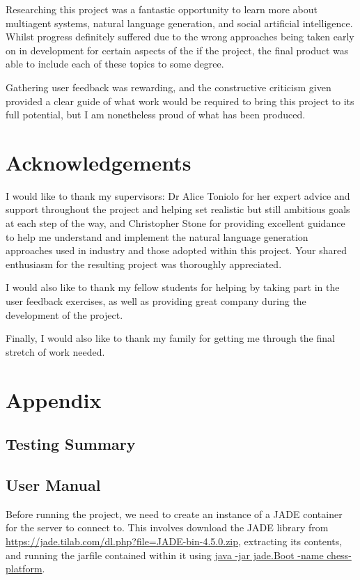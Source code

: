 \documentclass{article}
\begin{document}
Researching this project was a fantastic opportunity to learn more about multiagent systems, natural language generation, and social artificial intelligence. Whilst progress definitely suffered due to the wrong approaches being taken early on in development for certain aspects of the if the project, the final product was able to include each of these topics to some degree. 

Gathering user feedback was rewarding, and the constructive criticism given provided a clear guide of what work would be required to bring this project to its full potential, but I am nonetheless proud of what has been produced.

\section{Acknowledgements}

I would like to thank my supervisors: Dr Alice Toniolo for her expert advice and support throughout the project and helping set realistic but still ambitious goals at each step of the way, and Christopher Stone for providing excellent guidance to help me understand and implement the natural language generation approaches used in industry and those adopted within this project. Your shared enthusiasm for the resulting project was thoroughly appreciated.

I would also like to thank my fellow students for helping by taking part in the user feedback exercises, as well as providing great company during the development of the project.

Finally, I would also like to thank my family for getting me through the final stretch of work needed. 





\section{Appendix}

\subsection{Testing Summary}


\subsection{User Manual}

Before running the project, we need to create an instance of a JADE container for the server to connect to. This involves download the JADE library from \url{https://jade.tilab.com/dl.php?file=JADE-bin-4.5.0.zip}, extracting its contents, and running the jarfile contained within it using \url{java -jar jade.Boot -name chess-platform}.
\end{document}
